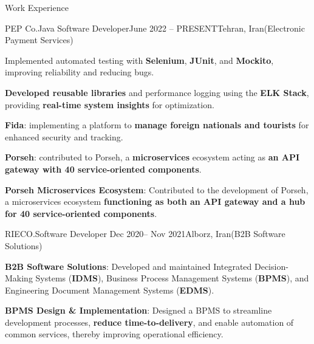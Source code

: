 \documentclass[]{kyvernitis-resume}
\begin{document}
\begin{section}{Work Experience}
\begin{subsection}{PEP Co.}{Java Software Developer}{June 2022 -- PRESENT}{Tehran, Iran}{(Electronic Payment Services)}
		\item Implemented automated testing with \textbf{Selenium}, \textbf{JUnit}, and \textbf{Mockito}, improving reliability and reducing bugs.

		\item \textbf{Developed reusable libraries} and performance logging using the \textbf{ELK Stack}, providing \textbf{real-time system insights} for optimization.

		\item \textbf{Fida}: implementing a platform to \textbf{manage foreign nationals and tourists} for enhanced security and tracking.
		\item \textbf{Porseh}: contributed to Porseh, a \textbf{microservices} ecosystem acting as \textbf{an API gateway with 40 service-oriented components}.
		\item \textbf{Porseh Microservices Ecosystem}: Contributed to the development of Porseh, a microservices ecosystem \textbf{functioning as both an API gateway and a hub for 40 service-oriented components}.
    \end{subsection}


 \begin{subsection}{RIECO.}{Software Developer }{Dec 2020-- Nov 2021}{Alborz, Iran}{(B2B Software Solutions)}
	
	\item \textbf{B2B Software Solutions}: Developed and maintained Integrated Decision-Making Systems (\textbf{IDMS}), Business Process Management Systems (\textbf{BPMS}), and Engineering Document Management Systems (\textbf{EDMS}).
	\item \textbf{BPMS Design \& Implementation}: Designed a BPMS to streamline development processes, \textbf{reduce time-to-delivery}, and enable automation of common services, thereby improving operational efficiency.
	

\end{subsection}
\end{section}
\end{document}
